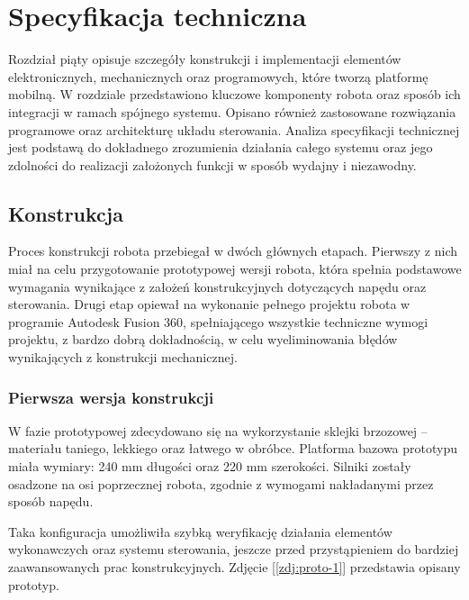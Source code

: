 \chapter{Specyfikacja techniczna}
\label{ch:06}

Rozdział piąty opisuje szczegóły konstrukcji i implementacji elementów elektronicznych, mechanicznych oraz programowych, które tworzą platformę mobilną. W rozdziale przedstawiono kluczowe komponenty robota oraz sposób ich integracji w ramach spójnego systemu. Opisano również zastosowane rozwiązania programowe oraz architekturę układu sterowania. Analiza specyfikacji technicznej jest podstawą do dokładnego zrozumienia działania całego systemu oraz jego zdolności do realizacji założonych funkcji w sposób wydajny i niezawodny.

\section{Konstrukcja}
Proces konstrukcji robota przebiegał w dwóch głównych etapach. Pierwszy z nich miał na celu przygotowanie prototypowej wersji robota, która spełnia podstawowe wymagania wynikające z założeń konstrukcyjnych dotyczących napędu oraz sterowania. Drugi etap opiewał na wykonanie pełnego projektu robota w programie Autodesk Fusion 360, spełniającego wszystkie techniczne wymogi projektu, z bardzo dobrą dokładnością, w celu wyeliminowania błędów wynikających z konstrukcji mechanicznej.

\subsection{Pierwsza wersja konstrukcji}

W fazie prototypowej zdecydowano się na wykorzystanie sklejki brzozowej – materiału taniego, lekkiego oraz łatwego w obróbce. Platforma bazowa prototypu miała wymiary: 240 mm długości oraz 220 mm szerokości. Silniki zostały osadzone na osi poprzecznej robota, zgodnie z wymogami nakładanymi przez sposób napędu. 

Taka konfiguracja umożliwiła szybką weryfikację działania elementów wykonawczych oraz systemu sterowania, jeszcze przed przystąpieniem do bardziej zaawansowanych prac konstrukcyjnych. Zdjęcie [\ref{zdj:proto-1}] przedstawia opisany prototyp. 

